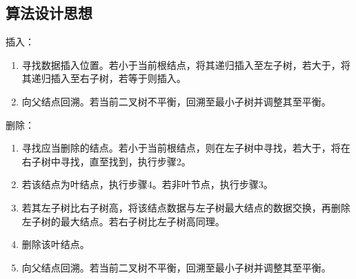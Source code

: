 \documentclass[a4paper,11pt,UTF8]{ctexart}
\begin{document}
\subsection{算法设计思想}

插入：
\begin{enumerate}
    \item 寻找数据插入位置。若小于当前根结点，将其递归插入至左子树，若大于，将其递归插入至右子树，若等于则插入。
    \item 向父结点回溯。若当前二叉树不平衡，回溯至最小子树并调整其至平衡。
\end{enumerate}\par

删除：
\begin{enumerate}
    \item 寻找应当删除的结点。若小于当前根结点，则在左子树中寻找，若大于，将在右子树中寻找，直至找到，执行步骤2。
    \item 若该结点为叶结点，执行步骤4。若非叶节点，执行步骤3。
    \item 若其左子树比右子树高，将该结点数据与左子树最大结点的数据交换，再删除左子树的最大结点。若右子树比左子树高同理。
    \item 删除该叶结点。
    \item 向父结点回溯。若当前二叉树不平衡，回溯至最小子树并调整其至平衡。
\end{enumerate}\par
\end{document}

